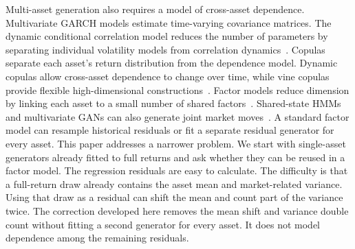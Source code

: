 Multi-asset generation also requires a model of cross-asset dependence.
Multivariate GARCH models estimate time-varying covariance matrices. The
dynamic conditional correlation model reduces the number of parameters by
separating individual volatility models from correlation
dynamics~\cite{engle2002dcc,bauwensLaurentRombouts2006}. Copulas separate each
asset's return distribution from the dependence model. Dynamic copulas allow
cross-asset dependence to change over time, while vine copulas provide flexible
high-dimensional constructions~\cite{patton2006,
aasCzadoFrigessiBakken2009}. Factor models reduce dimension by linking each
asset to a small number of shared
factors~\cite{sharpe1963,rossAPT1976,famaFrench1993}. Shared-state HMMs and
multivariate GANs can also generate joint market
moves~\cite{diasVermuntRamos2010,rizzatoEtAl2023}. A standard factor model can
resample historical residuals or fit a separate residual generator for every
asset. This paper addresses a narrower problem. We start with single-asset
generators already fitted to full returns and ask whether they can be reused in
a factor model.
The regression residuals are easy to calculate. The difficulty is that a
full-return draw already contains the asset mean and market-related variance.
Using that draw as a residual can shift the mean and count part of the variance
twice. The correction developed here removes the mean shift and variance
double count without fitting a second generator for every asset. It does not
model dependence among the remaining residuals.
